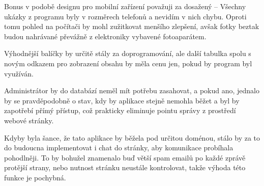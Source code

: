\documentclass[a4paper,oneside,12pt]{report}
\let\openright=\clearpage
\begin{document}
Bonus v podobě designu pro mobilní zařízení považuji za dosažený -- Všechny ukázky z
programu byly v rozměrech telefonů a nevidím v nich chybu. Oproti tomu pohled na počítači
by mohl zužitkovat menšího zlepšení, avšak fotky beztak budou nahrávané převážně z
elektroniky vybavené fotoaparátem.

Výhodnější balíčky by určitě stály za doprogramování, ale další tabulka spolu s novým
odkazem pro zobrazení obsahu by měla cenu jen, pokud by program byl využíván.

Administrátor by do databází neměl mít potřebu zasahovat, a pokud ano, jednalo by se
pravděpodobně o stav, kdy by aplikace stejně nemohla běžet a byl by zapotřebí přímý
přístup, což prakticky eliminuje pointu správy z prostředí webové stránky.

Kdyby byla šance, že tato aplikace by běžela pod určitou doménou, stálo by za to do
budoucna implementovat i chat do stránky, aby komunikace probíhala pohodlněji. To by
bohužel znamenalo buď větší spam emailů po každé zprávě protější strany, nebo nutnost
stránku neustále kontrolovat, takže výhoda této funkce je pochybná.



\listoffigures
\openright
\end{document}
